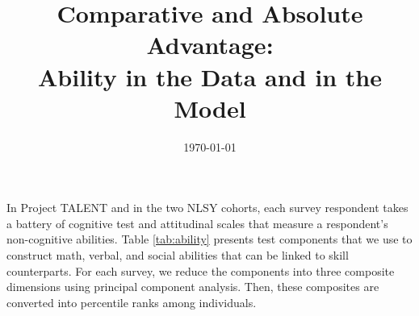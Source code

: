\documentclass[onehalfspacing,11pt]{article}
\begin{document}

\title{Comparative and Absolute Advantage:\\%
Ability in the Data and in the Model}


\date{\today \\ \vspace{5mm} }%

\maketitle

%
In Project TALENT and in the two NLSY cohorts, each survey respondent takes a battery of cognitive test and attitudinal scales that measure a respondent's non-cognitive abilities. Table \ref{tab:ability} presents test components that we use to construct math, verbal, and social abilities that can be linked to skill counterparts. For each survey, we reduce the components into three composite dimensions using principal component analysis. Then, these composites are converted into percentile ranks among individuals.
\end{document}
